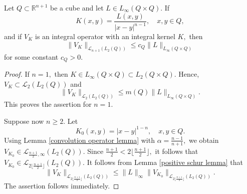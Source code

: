 \documentclass[12pt]{amsart}
\begin{document}
\begin{lemma}\label{rough estimate} Let $Q\subset\mathbb{R}^{n+1}$ be a cube and let $L\in L_{\infty}(Q\times Q).$ If
$$K(x,y)=\frac{L(x,y)}{|x-y|^{n-1}},\quad x,y\in Q,$$
and if $V_K$ is an integral operator with an integral kernel $K,$ then
$$\|V_K\|_{\mathcal{L}_{n+1}(L_2(Q))}\leq c_Q\|L\|_{L_{\infty}(Q\times Q)}$$
for some constant $c_Q>0$.
\end{lemma}
\begin{proof} If $n=1,$ then $K\in L_{\infty}(Q\times Q)\subset L_2(Q\times Q).$ Hence, $V_K\subset \mathcal{L}_2(L_2(Q))$ and
$$\|V_K\|_{\mathcal{L}_2(L_2(Q))}\leq m(Q)\|L\|_{L_{\infty}(Q\times Q)}.$$
This proves the assertion for $n=1.$
	
Suppose now $n\geq 2.$ Let
$$K_0(x,y)=|x-y|^{1-n},\quad x,y\in Q.$$
Using Lemma \ref{convolution operator lemma} with $\alpha=\frac{n-1}{n+1},$ we obtain $V_{K_0}\in\mathcal{L}_{\frac{n+1}{2},\infty}(L_2(Q)).$ Since $\frac{n+1}{2}< 2\lfloor\frac{n+1}{2}\rfloor,$ it follows that $V_{K_0}\in\mathcal{L}_{2\lfloor\frac{n+1}{2}\rfloor}(L_2(Q)).$ It follows from Lemma \ref{positive schur lemma} that
$$\|V_K\|_{\mathcal{L}_{2\lfloor\frac{n+1}{2}\rfloor}(L_2(Q))}\leq\|L\|_{\infty}\|V_{K_0}\|_{\mathcal{L}_{2\lfloor\frac{n+1}{2}\rfloor}(L_2(Q))}.$$
The assertion follows immediately.
\end{proof}
\end{document}
